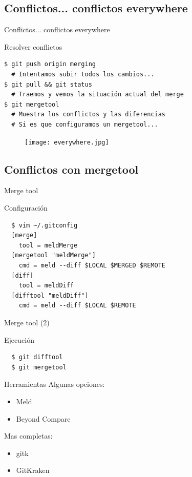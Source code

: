 \documentclass{beamer}
\begin{document}
\subsection{Conflictos... conflictos everywhere}

\begin{frame}[fragile]{Conflictos... conflictos everywhere}

  \begin{block}{Resolver conflictos}
    \begin{verbatim}
$ git push origin merging
  # Intentamos subir todos los cambios...
$ git pull && git status
  # Traemos y vemos la situación actual del merge
$ git mergetool
  # Muestra los conflictos y las diferencias
  # Si es que configuramos un mergetool...
    \end{verbatim}
  \end{block}
  \begin{figure}
    \texttt{[image: everywhere.jpg]} 
  \end{figure}
\end{frame}

\subsection{Conflictos con mergetool}

\begin{frame}[fragile]{Merge tool}

  \begin{block}{Configuración}
      \begin{verbatim}
  $ vim ~/.gitconfig
  [merge]
    tool = meldMerge
  [mergetool "meldMerge"]
    cmd = meld --diff $LOCAL $MERGED $REMOTE
  [diff]
    tool = meldDiff
  [difftool "meldDiff"]
    cmd = meld --diff $LOCAL $REMOTE
      \end{verbatim}
  \end{block}

\end{frame}

\begin{frame}[fragile]{Merge tool (2)}

  \begin{block}{Ejecución}
      \begin{verbatim}
  $ git difftool
  $ git mergetool
      \end{verbatim}
  \end{block} \pause

  \begin{block}{Herramientas}
    Algunas opciones:
      \begin{itemize}
       \item Meld
       \item Beyond Compare
      \end{itemize}\pause
	Mas completas:
      \begin{itemize}
       \item gitk
       \item GitKraken
      \end{itemize}	
  \end{block}
  
\end{frame}
\end{document}
